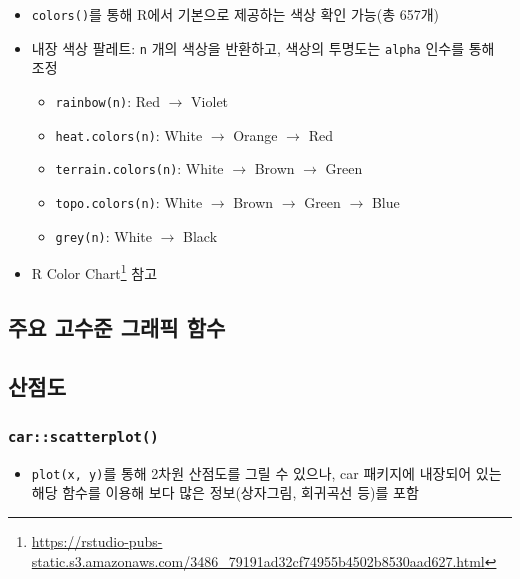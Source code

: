 \documentclass[
  11pt,
]{krantz}
\providecommand{\tightlist}{%
  \setlength{\itemsep}{0pt}\setlength{\parskip}{0pt}}
\renewcommand{\href}[2]{#2\footnote{\url{#1}}}
\begin{document}
\normalsize

\begin{itemize}
\tightlist
\item
  \texttt{colors()}를 통해 R에서 기본으로 제공하는 색상 확인 가능(총 657개)
\item
  내장 색상 팔레트: \texttt{n} 개의 색상을 반환하고, 색상의 투명도는 \texttt{alpha} 인수를 통해 조정

  \begin{itemize}
  \tightlist
  \item
    \texttt{rainbow(n)}: Red \(\rightarrow\) Violet
  \item
    \texttt{heat.colors(n)}: White \(\rightarrow\) Orange \(\rightarrow\) Red
  \item
    \texttt{terrain.colors(n)}: White \(\rightarrow\) Brown \(\rightarrow\) Green
  \item
    \texttt{topo.colors(n)}: White \(\rightarrow\) Brown \(\rightarrow\) Green \(\rightarrow\) Blue
  \item
    \texttt{grey(n)}: White \(\rightarrow\) Black
  \end{itemize}
\item
  \href{https://rstudio-pubs-static.s3.amazonaws.com/3486_79191ad32cf74955b4502b8530aad627.html}{R Color Chart} 참고
\end{itemize}

\hypertarget{main-high-level-graph}{%
\subsection{주요 고수준 그래픽 함수}\label{main-high-level-graph}}

\hypertarget{scatter-plot}{%
\subsection{산점도}\label{scatter-plot}}

\hypertarget{car_scatterplot}{%
\subsubsection{\texorpdfstring{\textbf{\texttt{car::scatterplot()}}}{car::scatterplot()}}\label{car_scatterplot}}

\begin{itemize}
\tightlist
\item
  \texttt{plot(x,\ y)}를 통해 2차원 산점도를 그릴 수 있으나, car 패키지에 내장되어 있는 해당 함수를 이용해 보다 많은 정보(상자그림, 회귀곡선 등)를 포함
\end{itemize}
\end{document}
